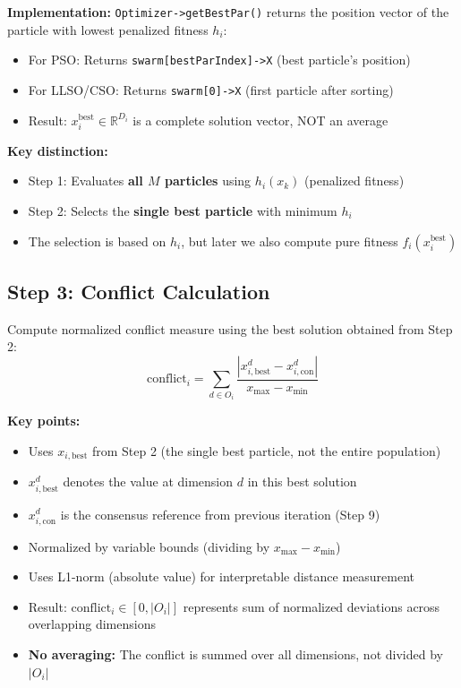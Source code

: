 \documentclass[11pt,a4paper]{article}
\begin{document}
\textbf{Implementation:} \texttt{Optimizer->getBestPar()} returns the position vector of the particle with lowest penalized fitness $h_i$:
\begin{itemize}
    \item For PSO: Returns \texttt{swarm[bestParIndex]->X} (best particle's position)
    \item For LLSO/CSO: Returns \texttt{swarm[0]->X} (first particle after sorting)
    \item Result: $x_i^{\text{best}} \in \mathbb{R}^{D_i}$ is a complete solution vector, NOT an average
\end{itemize}

\textbf{Key distinction:}
\begin{itemize}
    \item Step 1: Evaluates \textbf{all $M$ particles} using $h_i(x_k)$ (penalized fitness)
    \item Step 2: Selects the \textbf{single best particle} with minimum $h_i$
    \item The selection is based on $h_i$, but later we also compute pure fitness $f_i(x_i^{\text{best}})$
\end{itemize}

\subsection{Step 3: Conflict Calculation}
Compute normalized conflict measure using the best solution obtained from Step 2:
\begin{equation}
\text{conflict}_i = \sum_{d \in O_i} \frac{|x_{i,\text{best}}^d - x_{i,\text{con}}^d|}{x_{\max} - x_{\min}}
\end{equation}

\textbf{Key points:}
\begin{itemize}
    \item Uses $x_{i,\text{best}}$ from Step 2 (the single best particle, not the entire population)
    \item $x_{i,\text{best}}^d$ denotes the value at dimension $d$ in this best solution
    \item $x_{i,\text{con}}^d$ is the consensus reference from previous iteration (Step 9)
    \item Normalized by variable bounds (dividing by $x_{\max} - x_{\min}$)
    \item Uses L1-norm (absolute value) for interpretable distance measurement
    \item Result: $\text{conflict}_i \in [0, |O_i|]$ represents sum of normalized deviations across overlapping dimensions
    \item \textbf{No averaging:} The conflict is summed over all dimensions, not divided by $|O_i|$
\end{itemize}
\end{document}
